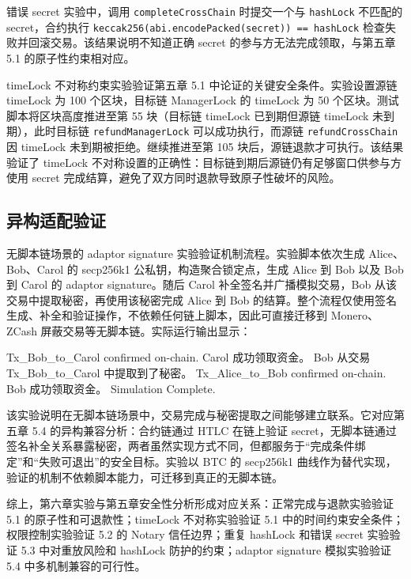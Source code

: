 错误 secret 实验中，调用 \texttt{completeCrossChain} 时提交一个与 \texttt{hashLock} 不匹配的 secret，合约执行 \texttt{keccak256(abi.encodePacked(secret)) == hashLock} 检查失败并回滚交易。该结果说明不知道正确 secret 的参与方无法完成领取，与第五章 5.1 的原子性约束相对应。

timeLock 不对称约束实验验证第五章 5.1 中论证的关键安全条件。实验设置源链 timeLock 为 100 个区块，目标链 ManagerLock 的 timeLock 为 50 个区块。测试脚本将区块高度推进至第 55 块（目标链 timeLock 已到期但源链 timeLock 未到期），此时目标链 \texttt{refundManagerLock} 可以成功执行，而源链 \texttt{refundCrossChain} 因 timeLock 未到期被拒绝。继续推进至第 105 块后，源链退款才可执行。该结果验证了 timeLock 不对称设置的正确性：目标链到期后源链仍有足够窗口供参与方使用 secret 完成结算，避免了双方同时退款导致原子性破坏的风险。


\subsection{异构适配验证}


无脚本链场景的 adaptor signature 实验验证机制流程。实验脚本依次生成 Alice、Bob、Carol 的 secp256k1 公私钥，构造聚合锁定点，生成 Alice 到 Bob 以及 Bob 到 Carol 的 adaptor signature。随后 Carol 补全签名并广播模拟交易，Bob 从该交易中提取秘密，再使用该秘密完成 Alice 到 Bob 的结算。整个流程仅使用签名生成、补全和验证操作，不依赖任何链上脚本，因此可直接迁移到 Monero、ZCash 屏蔽交易等无脚本链。实际运行输出显示：


\begin{codeblock}[extendedchars=true]
Tx_Bob_to_Carol confirmed on-chain.
Carol 成功领取资金。
Bob 从交易 Tx_Bob_to_Carol 中提取到了秘密。
Tx_Alice_to_Bob confirmed on-chain.
Bob 成功领取资金。
Simulation Complete.
\end{codeblock}


该实验说明在无脚本链场景中，交易完成与秘密提取之间能够建立联系。它对应第五章 5.4 的异构兼容分析：合约链通过 HTLC 在链上验证 secret，无脚本链通过签名补全关系暴露秘密，两者虽然实现方式不同，但都服务于“完成条件绑定”和“失败可退出”的安全目标。实验以 BTC 的 secp256k1 曲线作为替代实现，验证的机制不依赖脚本能力，可迁移到真正的无脚本链。


综上，第六章实验与第五章安全性分析形成对应关系：正常完成与退款实验验证 5.1 的原子性和可退款性；timeLock 不对称实验验证 5.1 中的时间约束安全条件；权限控制实验验证 5.2 的 Notary 信任边界；重复 hashLock 和错误 secret 实验验证 5.3 中对重放风险和 hashLock 防护的约束；adaptor signature 模拟实验验证 5.4 中多机制兼容的可行性。


